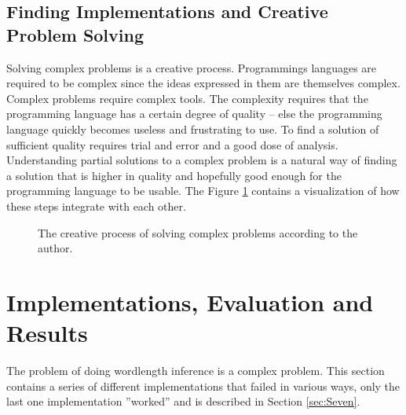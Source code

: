 \documentclass[msc,lith,english]{liuthesis}
\begin{document}
\section{Finding Implementations and Creative Problem Solving}
Solving complex problems is a creative process. Programmings languages are required to be complex since the ideas expressed in them are themselves complex. Complex problems require complex tools. The complexity requires that the programming language
has a certain degree of quality -- else the programming language quickly becomes useless and frustrating to use. To find a solution of sufficient quality requires trial and error and a good dose of analysis. Understanding partial solutions to a complex problem is a natural way of finding a solution that is higher in quality and hopefully good enough for the programming language to be usable. The Figure \ref{figCreativeProcess} contains a visualization of how these steps integrate with each other.

\begin{center}
\begin{figure}[h!]
\centering
{}
\caption{The creative process of solving complex problems according to the author.}
\label{figCreativeProcess}
\end{figure}
\end{center}

\chapter{Implementations, Evaluation and Results}
\label{cha:Implementation}
The problem of doing wordlength inference is a complex problem. This section contains a series of different implementations that failed in various ways, only the last one implementation ''worked'' and is described in Section \ref{sec:Seven}.
\end{document}
